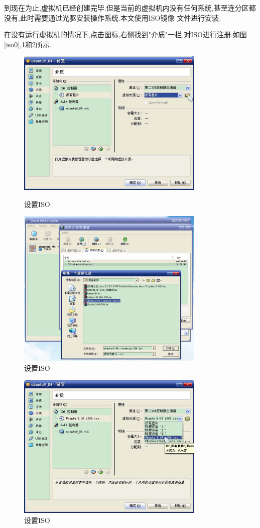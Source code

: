 \documentclass[12pt,a4paper,titlepage]{article}
\begin{document}
到现在为止,虚拟机已经创建完毕.但是当前的虚拟机内没有任何系统,甚至连分区都没有,此时需要通过光驱安装操作系统.本文使用ISO镜像
文件进行安装.

在没有运行虚拟机的情况下,点击图标,右侧找到"介质"一栏,对ISO进行注册.如图\ref{iso0},\ref{iso1}和\ref{iso2}所示.
\begin{figure}[!bthp]
\centering
\includegraphics[width=0.8\textwidth,scale=0.8]{pic/f_vb_setting_iso.eps}
\caption{设置ISO\label{iso0}}
\includegraphics[width=0.8\textwidth,scale=0.8]{pic/f_vb_setting_iso_register.eps}
\caption{设置ISO\label{iso1}}
\end{figure}
\begin{figure}[!bthp]
\centering
\includegraphics[width=0.8\textwidth,scale=0.8]{pic/f_vb_setting_iso_set.eps}
\caption{设置ISO\label{iso2}}
\end{figure}
\end{document}
